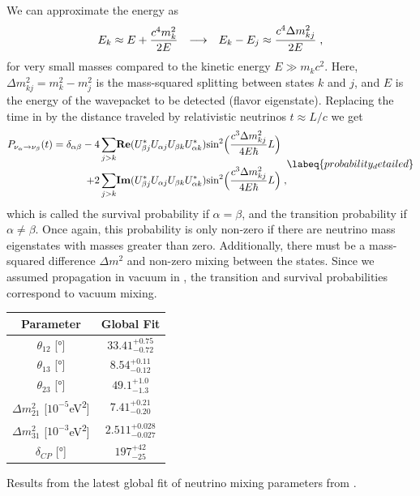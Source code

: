 We can approximate the energy as
\begin{equation}
    E_k \approx E+\frac{c^4m^2_k}{2E} \hspace{0.25cm} \longrightarrow \hspace{0.25cm} E_k-E_j \approx \frac{c^4\Delta m^2_{kj}}{2E}
    \;,
\end{equation}
for very small masses compared to the kinetic energy $E\gg m_kc^2$. Here, $\Delta m^2_{kj}=m^2_k-m^2_j$ is the mass-squared splitting between states $k$ and $j$, and $E$ is the energy of the wavepacket to be detected (flavor eigenstate). Replacing the time in  by the distance traveled by relativistic neutrinos $t\approx L/c$ we get
\begin{equation}
    \begin{split}
        P_{\nu_\alpha \rightarrow \nu_\beta}(t)
        = 
        \delta_{\alpha \beta}
        -
        4\sum_{j>k}&\textbf{Re}(U^*_{\beta j}U_{\alpha j}U_{\beta k}U^*_{\alpha k})\textrm{sin}^2\Big( \frac{c^3\Delta m^2_{kj}}{4E\hbar}L \Big) \\
        +
        2\sum_{j>k}&\textbf{Im}(U^*_{\beta j}U_{\alpha j}U_{\beta k}U^*_{\alpha k})\textrm{sin}^2\Big( \frac{c^3\Delta m^2_{kj}}{4E\hbar}L \Big)
        \;,
    \end{split}
    \labeq{probability_detailed}
\end{equation}
which is called the survival probability if $\alpha=\beta$, and the transition probability if $\alpha\neq\beta$. Once again, this probability is only non-zero if there are neutrino mass eigenstates with masses greater than zero. Additionally, there must be a mass-squared difference $\Delta m^2$ and non-zero mixing between the states. Since we assumed propagation in vacuum in , the transition and survival probabilities correspond to vacuum mixing.

{\renewcommand{\arraystretch}{0.7}
\begin{margintable}[3cm]
    \footnotesize
    \begin{tabular}{ cc }
    \hline\hline    
    Parameter & Global Fit \\
    \hline\hline    
    $\theta_{12}$ [\si{\degree}] & $33.41^{+0.75}_{-0.72}$ \\
    $\theta_{13}$ [\si{\degree}] & $8.54^{+0.11}_{-0.12}$ \\
    $\theta_{23}$ [\si{\degree}] & $49.1^{+1.0}_{-1.3}$ \\
    \hline
    $\Delta m^2_{21}$ [$10^{-5}$\si{\electronvolt^2}] & $7.41^{+0.21}_{-0.20}$ \\
    $\Delta m^2_{31}$ [$10^{-3}$\si{\electronvolt^2}] & $2.511^{+0.028}_{-0.027}$ \\
    \hline
    $\delta_{CP}$ [\si{\degree}] & $197^{+42}_{-25}$ \\
    \hline
    \end{tabular}
\caption[Global fit neutrino mixing parameter results]{Results from the latest global fit of neutrino mixing parameters from \cite{nufit_5.2}.}
\end{margintable}
}

